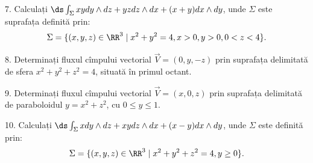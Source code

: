 7. Calculați $ \ds\int_\Sigma xy dy \wedge dz + yz dz \wedge dx + (x + y) dx \wedge dy $,
unde $ \Sigma $ este suprafața definită prin:
\[
  \Sigma = \{ (x, y, z) \in \RR^3 \mid x^2 + y^2 = 4, x > 0, y > 0, 0 < z < 4 \}.
\]

\vspace{0.3cm}

8. Determinați fluxul cîmpului vectorial $ \vec{V} = (0, y, -z) $
prin suprafața delimitată de sfera $ x^2 + y^2 + z^2 = 4 $, situată
în primul octant.

\vspace{0.3cm}

9. Determinați fluxul cîmpului vectorial $ \vec{V} = (x, 0, z) $ prin
suprafața delimitată de paraboloidul $ y = x^2 + z^2 $, cu $ 0 \leq y \leq 1 $.

\vspace{0.3cm}

10. Calculați $ \ds\int_\Sigma x dy \wedge dz + xy dz \wedge dx + (x - y) dx \wedge dy $,
unde $ \Sigma $ este definită prin:
\[
  \Sigma = \{ (x, y, z) \in \RR^3 \mid x^2 + y^2 + z^2 = 4, y \geq 0 \}.
\]
